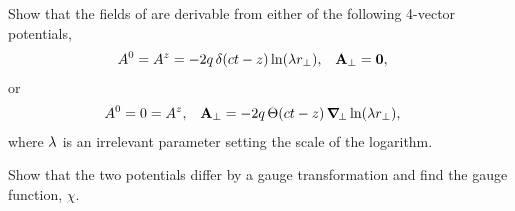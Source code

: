 \newcommand{\Ao}{A^0}
\newcommand{\Az}{A^z}
\newcommand{\vA}{\vb{A}}
\newcommand{\vAperp}{\vA_\perp}
\newcommand{\Thtctz}{\Tht(ct - z)}

\begin{problem}
	Show that the fields of  are derivable from either of the following 4-vector potentials,
	\begin{align} \label{given3.c.1}
		\Ao &= \Az = -2q \,\delctz \ln(\lam \rperp), &
		\vAperp &= \vo,
	\end{align}
	or
	\begin{align} \label{given3.c.2}
		\Ao &= 0 = \Az, &
		\vAperp &= -2q \,\Thtctz \,\grperp \ln(\lam \rperp),
	\end{align}
	where $\lambda$ is an irrelevant parameter setting the scale of the logarithm.
	
	Show that the two potentials differ by a gauge transformation and find the gauge function, $\chi$.
\end{problem}

\newcommand{\Aa}{A^\alp}
\newcommand{\Apa}{{A'}^\alp}
\newcommand{\Apo}{{A'}^0}
\newcommand{\Apz}{{A'}^z}

